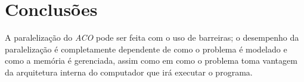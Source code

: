\section{Conclusões}
A paralelização do \textit{ACO} pode ser feita com o uso de barreiras; o desempenho da paralelização é completamente dependente de como o problema é modelado e como a memória é gerenciada, assim como em como o problema toma vantagem da arquitetura interna do computador que irá executar o programa.